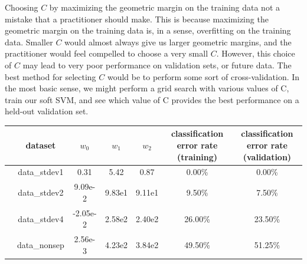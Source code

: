 \documentclass[10pt]{article}
\begin{document}
Choosing $C$ by maximizing the geometric margin on the training data not a mistake that a practitioner should make. This is because maximizing the geometric margin on the training data is, in a sense, overfitting on the training data. Smaller $C$ would almost always give us larger geometric margins, and the practitioner would feel compelled to choose a very small $C$. However, this choice of $C$ may lead to very poor performance on validation sets, or future data. The best method for selecting $C$ would be to perform some sort of cross-validation. In the most basic sense, we might perform a grid search with various values of C, train our soft SVM, and see which value of C provides the best performance on a held-out validation set.



\begin{table}
\begin{tabular}{c c|c|c|c|c|c}
\toprule
{} & dataset & $w_0$ & $w_1$ & $w_2$ & classification error rate (training) & classification error rate (validation) \\
\midrule
  & data\_stdev1 & 0.31 & 5.42 & 0.87 & 0.00\% & 0.00\% \\
  & data\_stdev2 & 9.09e-2 & 9.83e1 & 9.11e1 & 9.50\% & 7.50\% \\
  & data\_stdev4 & -2.05e-2 & 2.58e2 & 2.40e2 & 26.00\% & 23.50\% \\
  & data\_nonsep & 2.56e-3 & 4.23e2 & 3.84e2 & 49.50\% & 51.25\% \\
\bottomrule
\end{tabular}
\end{table}
\end{document}
